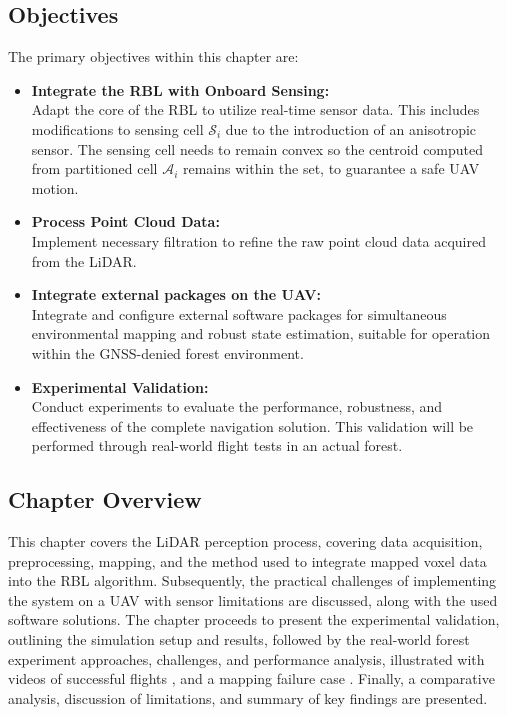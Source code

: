         \subsection{Objectives}
            The primary objectives within this chapter are: 
            \begin{itemize}
                \item \textbf{Integrate the \ac{RBL} with Onboard Sensing: } \\
                    Adapt the core of the \ac{RBL} to utilize real-time sensor data. 
                    This includes modifications to sensing cell $\mathcal{S}_i$ due to the introduction of an anisotropic sensor. 
                    The sensing cell needs to remain convex so the centroid computed from partitioned cell $\mathcal{A}_i$ remains within the set, to guarantee a safe \ac{UAV} motion.
                \item \textbf{Process Point Cloud Data: } \\
                    Implement necessary filtration to refine the raw point cloud data acquired from the \ac{LiDAR}.
                \item \textbf{Integrate external packages on the \ac{UAV}: } \\
                    Integrate and configure external software packages for simultaneous environmental mapping and robust state estimation, suitable for operation within the \ac{GNSS}-denied forest environment.
                \item \textbf{Experimental Validation: } \\
                    Conduct experiments to evaluate the performance, robustness, and effectiveness of the complete navigation solution. 
                    This validation will be performed through real-world flight tests in an actual forest.
            \end{itemize}

        \subsection{Chapter Overview}
            This chapter covers the \ac{LiDAR} perception process, covering data acquisition, preprocessing, mapping, and the method used to integrate mapped voxel data into the \ac{RBL} algorithm. 
            Subsequently, the practical challenges of implementing the system on a \ac{UAV} with sensor limitations are discussed, along with the used software solutions. 
            The chapter proceeds to present the experimental validation, outlining the simulation setup and results, followed by the real-world forest experiment approaches, challenges, and performance analysis, illustrated with videos of successful flights \cite{aggressive_flight}, \cite{conservative_flight} and a mapping failure case \cite{flight_fail}. 
            Finally, a comparative analysis, discussion of limitations, and summary of key findings are presented.
    
